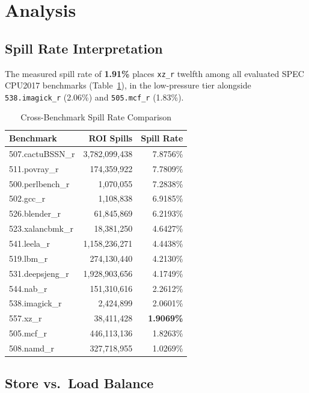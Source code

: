 \documentclass[conference]{IEEEtran}
\begin{document}
\section{Analysis}

\subsection{Spill Rate Interpretation}

The measured spill rate of \textbf{1.91\%} places \texttt{xz\_r}
twelfth among all evaluated SPEC CPU2017 benchmarks
(Table~\ref{tab:compare}), in the low-pressure tier alongside
\texttt{538.imagick\_r} (2.06\%) and \texttt{505.mcf\_r} (1.83\%).

\begin{table}[H]
\centering
\caption{Cross-Benchmark Spill Rate Comparison}
\label{tab:compare}
\begin{tabular}{lrr}
\toprule
\textbf{Benchmark} & \textbf{ROI Spills} & \textbf{Spill Rate} \\
\midrule
507.cactuBSSN\_r & 3,782,099,438 & 7.8756\% \\
511.povray\_r    &   174,359,922 & 7.7809\% \\
500.perlbench\_r &     1,070,055 & 7.2838\% \\
502.gcc\_r       &     1,108,838 & 6.9185\% \\
526.blender\_r   &    61,845,869 & 6.2193\% \\
523.xalancbmk\_r &    18,381,250 & 4.6427\% \\
541.leela\_r     & 1,158,236,271 & 4.4438\% \\
519.lbm\_r       &   274,130,440 & 4.2130\% \\
531.deepsjeng\_r & 1,928,903,656 & 4.1749\% \\
544.nab\_r       &   151,310,616 & 2.2612\% \\
538.imagick\_r   &     2,424,899 & 2.0601\% \\
557.xz\_r        &    38,411,428 & \textbf{1.9069\%} \\
505.mcf\_r       &   446,113,136 & 1.8263\% \\
508.namd\_r      &   327,718,955 & 1.0269\% \\
\bottomrule
\end{tabular}
\end{table}

\subsection{Store vs.\ Load Balance}
\end{document}

